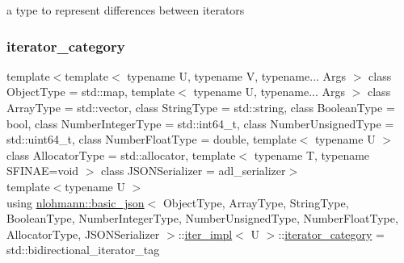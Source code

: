 a type to represent differences between iterators 

\mbox{\label{classnlohmann_1_1basic__json_1_1iter__impl_adbe1b700b9cdc38f6991fc68683a9c2c}} 
\subsubsection{\texorpdfstring{iterator\_category}{iterator\_category}}
{\footnotesize\ttfamily template$<$template$<$ typename U, typename V, typename... Args $>$ class Object\+Type = std\+::map, template$<$ typename U, typename... Args $>$ class Array\+Type = std\+::vector, class String\+Type  = std\+::string, class Boolean\+Type  = bool, class Number\+Integer\+Type  = std\+::int64\+\_\+t, class Number\+Unsigned\+Type  = std\+::uint64\+\_\+t, class Number\+Float\+Type  = double, template$<$ typename U $>$ class Allocator\+Type = std\+::allocator, template$<$ typename T, typename S\+F\+I\+N\+A\+E=void $>$ class J\+S\+O\+N\+Serializer = adl\+\_\+serializer$>$ \\
template$<$typename U $>$ \\
using \mbox{\hyperlink{classnlohmann_1_1basic__json}{nlohmann\+::basic\+\_\+json}}$<$ Object\+Type, Array\+Type, String\+Type, Boolean\+Type, Number\+Integer\+Type, Number\+Unsigned\+Type, Number\+Float\+Type, Allocator\+Type, J\+S\+O\+N\+Serializer $>$\+::\mbox{\hyperlink{classnlohmann_1_1basic__json_1_1iter__impl}{iter\+\_\+impl}}$<$ U $>$\+::\mbox{\hyperlink{classnlohmann_1_1basic__json_1_1iter__impl_adbe1b700b9cdc38f6991fc68683a9c2c}{iterator\+\_\+category}} =  std\+::bidirectional\+\_\+iterator\+\_\+tag}



